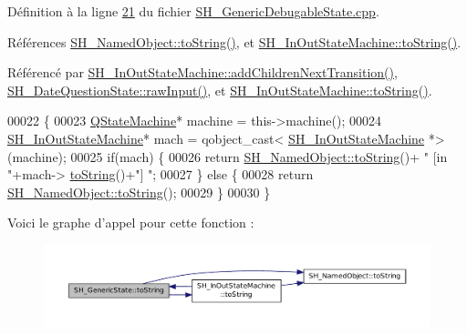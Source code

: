 Définition à la ligne \hyperlink{SH__GenericDebugableState_8cpp_source_l00021}{21} du fichier \hyperlink{SH__GenericDebugableState_8cpp_source}{S\-H\-\_\-\-Generic\-Debugable\-State.\-cpp}.



Références \hyperlink{classSH__NamedObject_af73e97f6476ca1ef3a22b159d179f5e7}{S\-H\-\_\-\-Named\-Object\-::to\-String()}, et \hyperlink{classSH__InOutStateMachine_a60ecd7de03d948e2d1e9cbedb5c3e5fa}{S\-H\-\_\-\-In\-Out\-State\-Machine\-::to\-String()}.



Référencé par \hyperlink{classSH__InOutStateMachine_a689e5513ef6ef3fc1598efacd413372e}{S\-H\-\_\-\-In\-Out\-State\-Machine\-::add\-Children\-Next\-Transition()}, \hyperlink{classSH__DateQuestionState_ac72e5b6b416614631032ff643d3c180e}{S\-H\-\_\-\-Date\-Question\-State\-::raw\-Input()}, et \hyperlink{classSH__InOutStateMachine_a60ecd7de03d948e2d1e9cbedb5c3e5fa}{S\-H\-\_\-\-In\-Out\-State\-Machine\-::to\-String()}.


\begin{DoxyCode}
00022 \{
00023     \hyperlink{classQStateMachine}{QStateMachine}* machine = this->machine();
00024     \hyperlink{classSH__InOutStateMachine}{SH\_InOutStateMachine}* mach = qobject\_cast<
      \hyperlink{classSH__InOutStateMachine}{SH\_InOutStateMachine} *>(machine);
00025     \textcolor{keywordflow}{if}(mach) \{
00026         \textcolor{keywordflow}{return} \hyperlink{classSH__NamedObject_af73e97f6476ca1ef3a22b159d179f5e7}{SH\_NamedObject::toString}()+ \textcolor{stringliteral}{" [in "}+mach->
      \hyperlink{classSH__InOutStateMachine_a60ecd7de03d948e2d1e9cbedb5c3e5fa}{toString}()+\textcolor{stringliteral}{"] "};
00027     \} \textcolor{keywordflow}{else} \{
00028         \textcolor{keywordflow}{return} \hyperlink{classSH__NamedObject_af73e97f6476ca1ef3a22b159d179f5e7}{SH\_NamedObject::toString}();
00029     \}
00030 \}
\end{DoxyCode}


Voici le graphe d'appel pour cette fonction \-:
\nopagebreak
\begin{figure}[H]
\begin{center}
\leavevmode
\includegraphics[width=350pt]{classSH__GenericState_a5480c5ee725fd801d8f6292cd4c803b8_cgraph}
\end{center}
\end{figure}




